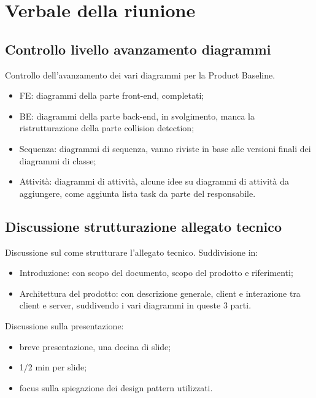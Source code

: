 \section{Verbale della riunione}

\subsection{Controllo livello avanzamento diagrammi}
Controllo dell'avanzamento dei vari diagrammi per la Product Baseline.
\begin{itemize}
	\item {FE:} diagrammi della parte front-end, completati;
	\item {BE:} diagrammi della parte back-end, in svolgimento, manca la ristrutturazione della parte collision detection;
	\item {Sequenza:} diagrammi di sequenza, vanno riviste in base alle versioni finali dei diagrammi di classe;
	\item {Attività:} diagrammi di attività, alcune idee su diagrammi di attività da aggiungere, come aggiunta lista task da parte del responsabile.
\end{itemize}

\subsection{Discussione strutturazione allegato tecnico}
Discussione sul come strutturare l'allegato tecnico.
Suddivisione in:
\begin{itemize}
	\item {Introduzione:} con scopo del documento, scopo del prodotto e riferimenti;
	\item {Architettura del prodotto:} con descrizione generale, client e interazione tra client e server, suddivendo i vari diagrammi in queste 3 parti.
\end{itemize}
Discussione sulla presentazione:
\begin{itemize}
	\item breve presentazione, una decina di slide;
	\item 1/2 min per slide;
	\item focus sulla spiegazione dei design pattern utilizzati.
\end{itemize}

